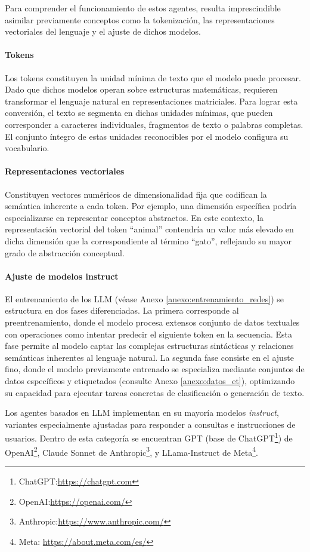 Para comprender el funcionamiento de estos agentes, resulta imprescindible asimilar previamente conceptos como la tokenización, las representaciones vectoriales del lenguaje y el ajuste de dichos modelos.

\paragraph{Tokens}\label{token}
Los tokens constituyen la unidad mínima de texto que el modelo puede procesar. Dado que dichos modelos operan sobre estructuras matemáticas, requieren transformar el lenguaje natural en representaciones matriciales. Para lograr esta conversión, el texto se segmenta en dichas unidades mínimas, que pueden corresponder a caracteres individuales, fragmentos de texto o palabras completas. El conjunto íntegro de estas unidades reconocibles por el modelo configura su vocabulario. 

\paragraph{Representaciones vectoriales}
Constituyen vectores numéricos de dimensionalidad fija que codifican la semántica inherente a cada token. Por ejemplo, una dimensión específica podría especializarse en representar conceptos abstractos. En este contexto, la representación vectorial del token ``animal'' contendría un valor más elevado en dicha dimensión que la correspondiente al término ``gato'', reflejando su mayor grado de abstracción conceptual.

\paragraph{Ajuste de modelos instruct}
El entrenamiento de los LLM (véase Anexo \ref{anexo:entrenamiento_redes}) se estructura en dos fases diferenciadas. La primera corresponde al preentrenamiento, donde el modelo procesa extensos conjunto de datos textuales con operaciones como intentar predecir el siguiente token en la secuencia. Esta fase permite al modelo captar las complejas estructuras sintácticas y relaciones semánticas inherentes al lenguaje natural. La segunda fase consiste en el ajuste fino, donde el modelo previamente entrenado se especializa mediante conjuntos de datos específicos y etiquetados (consulte Anexo \ref{anexo:datos_et}), optimizando su capacidad para ejecutar tareas concretas de clasificación o generación de texto.

Los agentes basados en LLM implementan en su mayoría modelos \textit{instruct}, variantes especialmente ajustadas para responder a consultas e instrucciones de usuarios. Dentro de esta categoría se encuentran GPT (base de ChatGPT\footnote{ChatGPT:\url{https://chatgpt.com}}) de OpenAI\footnote{OpenAI:\url{https://openai.com/}}, Claude Sonnet de Anthropic\footnote{Anthropic:\url{https://www.anthropic.com/}}, y LLama-Instruct de Meta\footnote{Meta: \url{https://about.meta.com/es/}}.




